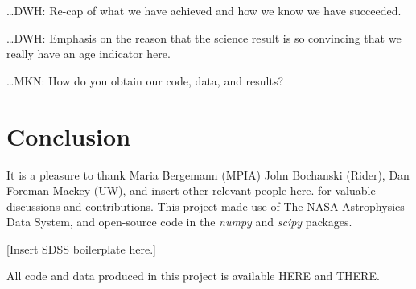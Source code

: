 \documentclass[12pt, preprint]{aastex}
\newcommand{\project}[1]{\textsl{#1}}
\begin{document}
\ldots DWH: Re-cap of what we have achieved and how we know we have
succeeded.

\ldots DWH: Emphasis on the reason that the science result is so
convincing that we really have an age indicator here.

\ldots MKN: How do you obtain our code, data, and results?

\section{Conclusion} 

\acknowledgments
It is a pleasure to thank Maria Bergemann (MPIA)
  John Bochanski (Rider),
  Dan Foreman-Mackey (UW), and
insert other relevant people here.
for valuable discussions and contributions.
This project made use of
  The NASA Astrophysics Data System,
  and open-source code in the \project{numpy} and \project{scipy} packages.

[Insert SDSS boilerplate here.]

All code and data produced in this project is available HERE and THERE.


\end{document}
